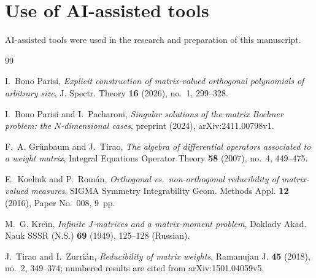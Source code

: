 \documentclass[11pt]{amsart}
\theoremstyle{definition}
\theoremstyle{remark}
\numberwithin{equation}{section}
\begin{document}
\section*{Use of AI-assisted tools}
AI-assisted tools were used in the research and preparation of this manuscript.

\begin{thebibliography}{99}

I.~Bono Parisi, \emph{Explicit construction of matrix-valued orthogonal
polynomials of arbitrary size}, J. Spectr. Theory \textbf{16} (2026), no.~1,
299--328.

I.~Bono Parisi and I.~Pacharoni, \emph{Singular solutions of the matrix
Bochner problem: the $N$-dimensional cases}, preprint (2024),
arXiv:2411.00798v1.

F.~A. Gr\"unbaum and J.~Tirao, \emph{The algebra of differential operators
associated to a weight matrix}, Integral Equations Operator Theory
\textbf{58} (2007), no.~4, 449--475.

E.~Koelink and P.~Rom\'an, \emph{Orthogonal vs.\ non-orthogonal
reducibility of matrix-valued measures}, SIGMA Symmetry Integrability Geom.
Methods Appl. \textbf{12} (2016), Paper No.~008, 9~pp.

M.~G. Kre\u{\i}n, \emph{Infinite $J$-matrices and a matrix-moment problem},
Doklady Akad. Nauk SSSR (N.S.) \textbf{69} (1949), 125--128 (Russian).

J.~Tirao and I.~Zurri\'an, \emph{Reducibility of matrix weights}, Ramanujan
J. \textbf{45} (2018), no.~2, 349--374; numbered results are cited from
arXiv:1501.04059v5.

\end{thebibliography}
\end{document}
